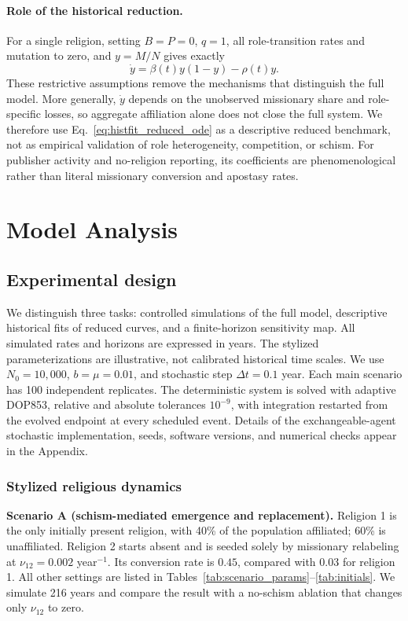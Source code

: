 \documentclass[11pt,a4paper]{article}
\begin{document}
\paragraph{Role of the historical reduction.}
For a single religion, setting $B=P=0$, $q=1$, all role-transition rates and mutation to zero, and $y=M/N$ gives exactly
\begin{equation}
\dot y=\beta(t)y(1-y)-\rho(t)y.
\label{eq:histfit_reduced_ode}
\end{equation}
These restrictive assumptions remove the mechanisms that distinguish the full model. More generally, $\dot y$ depends on the unobserved missionary share and role-specific losses, so aggregate affiliation alone does not close the full system. We therefore use Eq.~\eqref{eq:histfit_reduced_ode} as a descriptive reduced benchmark, not as empirical validation of role heterogeneity, competition, or schism. For publisher activity and no-religion reporting, its coefficients are phenomenological rather than literal missionary conversion and apostasy rates.
\section{Model Analysis}
\subsection{Experimental design}
\label{sec:experiments}
We distinguish three tasks: controlled simulations of the full model, descriptive historical fits of reduced curves, and a finite-horizon sensitivity map. All simulated rates and horizons are expressed in years. The stylized parameterizations are illustrative, not calibrated historical time scales. We use $N_0=10{,}000$, $b=\mu=0.01$, and stochastic step $\Delta t=0.1$ year. Each main scenario has 100 independent replicates. The deterministic system is solved with adaptive DOP853, relative and absolute tolerances $10^{-9}$, with integration restarted from the evolved endpoint at every scheduled event. Details of the exchangeable-agent stochastic implementation, seeds, software versions, and numerical checks appear in the Appendix.

\subsubsection{Stylized religious dynamics}


\textbf{Scenario A (schism-mediated emergence and replacement).}
Religion 1 is the only initially present religion, with 40\% of the population affiliated; 60\% is unaffiliated. Religion 2 starts absent and is seeded solely by missionary relabeling at $\nu_{12}=0.002$ year$^{-1}$. Its conversion rate is $0.45$, compared with $0.03$ for religion 1. All other settings are listed in Tables~\ref{tab:scenario_params}--\ref{tab:initials}. We simulate 216 years and compare the result with a no-schism ablation that changes only $\nu_{12}$ to zero.
\end{document}
